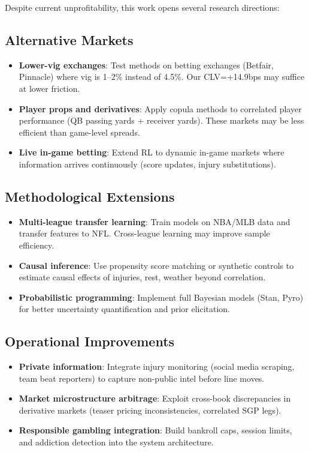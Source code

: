 Despite current unprofitability, this work opens several research directions:

\subsection{Alternative Markets}
\begin{itemize}
  \item \textbf{Lower-vig exchanges}: Test methods on betting exchanges (Betfair, Pinnacle) where vig is 1--2\% instead of 4.5\%. Our CLV=+14.9bps may suffice at lower friction.
  \item \textbf{Player props and derivatives}: Apply copula methods to correlated player performance (QB passing yards + receiver yards). These markets may be less efficient than game-level spreads.
  \item \textbf{Live in-game betting}: Extend RL to dynamic in-game markets where information arrives continuously (score updates, injury substitutions).
\end{itemize}

\subsection{Methodological Extensions}
\begin{itemize}
  \item \textbf{Multi-league transfer learning}: Train models on NBA/MLB data and transfer features to NFL. Cross-league learning may improve sample efficiency.
  \item \textbf{Causal inference}: Use propensity score matching or synthetic controls to estimate causal effects of injuries, rest, weather beyond correlation.
  \item \textbf{Probabilistic programming}: Implement full Bayesian models (Stan, Pyro) for better uncertainty quantification and prior elicitation.
\end{itemize}

\subsection{Operational Improvements}
\begin{itemize}
  \item \textbf{Private information}: Integrate injury monitoring (social media scraping, team beat reporters) to capture non-public intel before line moves.
  \item \textbf{Market microstructure arbitrage}: Exploit cross-book discrepancies in derivative markets (teaser pricing inconsistencies, correlated SGP legs).
  \item \textbf{Responsible gambling integration}: Build bankroll caps, session limits, and addiction detection into the system architecture.
\end{itemize}

